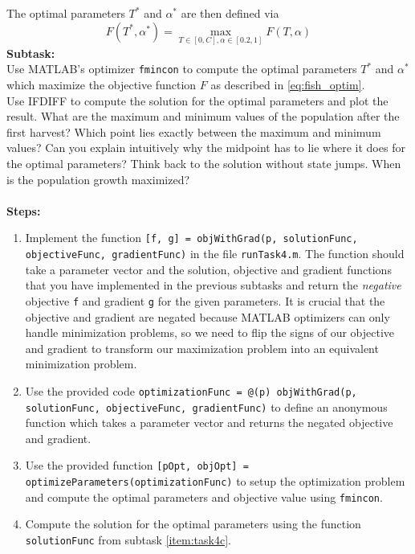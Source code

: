 \begin{enumerate}[label=\alph*)]
    The optimal parameters $T^*$ and $\alpha^*$ are then defined via
    \begin{equation}\label{eq:fish_optim}
       F(T^*, \alpha^*) = \max_{T \in [0, C], \alpha \in [0.2, 1]} F(T, \alpha)
    \end{equation}
    \textbf{Subtask:} \\
    Use MATLAB's optimizer \lstinline|fmincon| to compute the optimal parameters $T^*$ and $\alpha^*$ which maximize the objective function $F$ as described in \cref{eq:fish_optim}. \\
    Use IFDIFF to compute the solution for the optimal parameters and plot the result. What are the maximum and minimum values of the population after the first harvest? Which point lies exactly between the maximum and minimum values? Can you explain intuitively why the midpoint has to lie where it does for the optimal parameters? Think back to the solution without state jumps. When is the population growth maximized? \\ \\
    \textbf{Steps:}
    \begin{enumerate}[label=\arabic*.]
        \item Implement the function \lstinline|[f, g] = objWithGrad(p, solutionFunc, objectiveFunc, gradientFunc)| in the file \texttt{runTask4.m}. The function should take a parameter vector and the solution, objective and gradient functions that you have implemented in the previous subtasks and return the \textit{negative} objective \lstinline|f| and gradient \lstinline|g| for the given parameters. It is crucial that the objective and gradient are negated because MATLAB optimizers can only handle minimization problems, so we need to flip the signs of our objective and gradient to transform our maximization problem into an equivalent minimization problem.
        \item Use the provided code \lstinline|optimizationFunc = @(p) objWithGrad(p, solutionFunc, objectiveFunc, gradientFunc)| to define an anonymous function which takes a parameter vector and returns the negated objective and gradient.
        \item Use the provided function \lstinline|[pOpt, objOpt] = optimizeParameters(optimizationFunc)| to setup the optimization problem and compute the optimal parameters and objective value using \lstinline|fmincon|.
        \item Compute the solution for the optimal parameters using the function \lstinline|solutionFunc| from subtask \ref{item:task4c}.

\end{enumerate}
\end{enumerate}
